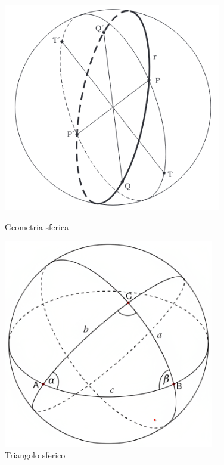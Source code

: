 \begin{figure}[H]
    \centering
    \begin{minipage}{0.3\textwidth}
        \centering
        \includegraphics[width=0.85\textwidth]{assets/spherical_geometry.png}
        \caption{Geometria sferica}
    \end{minipage} \hspace{1cm}
    \begin{minipage}{0.3\textwidth}
        \centering
        \includegraphics[width=0.82\textwidth]{assets/spherical_triangle.png}
        \caption{Triangolo sferico}
    \end{minipage}
\end{figure}

